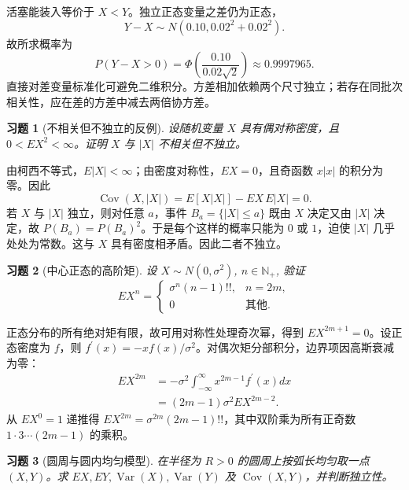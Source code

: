 \documentclass[UTF8,12pt,a4paper,fontset=fandol]{ctexart}
\newtheorem{exercise}{习题}[section]
\begin{document}
\begin{solve}\label{a:A5.30}活塞能装入等价于 $X<Y$。独立正态变量之差仍为正态，\[Y-X\sim N(0.10,0.02^2+0.02^2).\]故所求概率为\[P(Y-X>0)=\Phi\left(\frac{0.10}{0.02\sqrt2}\right)\approx0.9997965.\]直接对差变量标准化可避免二维积分。方差相加依赖两个尺寸独立；若存在同批次相关性，应在差的方差中减去两倍协方差。\end{solve}

\begin{exercise}[不相关但不独立的反例]\label{q:A5.32}
设随机变量 $X$ 具有偶对称密度，且 $0<EX^2<\infty$。证明 $X$ 与 $|X|$ 不相关但不独立。\par{}
\end{exercise}

\begin{solve}\label{a:A5.32}由柯西不等式，$E|X|<\infty$；由密度对称性，$EX=0$，且奇函数 $x|x|$ 的积分为零。因此\[\operatorname{Cov}(X,|X|)=E[X|X|]-EX\,E|X|=0.\]若 $X$ 与 $|X|$ 独立，则对任意 $a$，事件 $B_a=\{|X|\le a\}$ 既由 $X$ 决定又由 $|X|$ 决定，故 $P(B_a)=P(B_a)^2$。于是每个这样的概率只能为 $0$ 或 $1$，迫使 $|X|$ 几乎处处为常数。这与 $X$ 具有密度相矛盾。因此二者不独立。\end{solve}

\begin{exercise}[中心正态的高阶矩]\label{q:A5.33}
设 $X\sim N(0,\sigma^2)$, $n\in\mathbb{N}_+$, 验证
    \[EX^n=\begin{cases}
        \sigma^n(n-1)!!, & n=2m, \\
        0 & \text{其他}.
    \end{cases}\]\par{}
\end{exercise}

\begin{solve}\label{a:A5.33}正态分布的所有绝对矩有限，故可用对称性处理奇次幂，得到 $EX^{2m+1}=0$。设正态密度为 $f$，则 $f^{\prime}(x)=-xf(x)/\sigma^2$。对偶次矩分部积分，边界项因高斯衰减为零：\[\begin{aligned}EX^{2m}&=-\sigma^2\int_{-\infty}^{\infty}x^{2m-1}f^{\prime}(x)dx\\&=(2m-1)\sigma^2EX^{2m-2}.\end{aligned}\]从 $EX^0=1$ 递推得 $EX^{2m}=\sigma^{2m}(2m-1)!!$，其中双阶乘为所有正奇数 $1\cdot3\cdots(2m-1)$ 的乘积。\end{solve}

\begin{exercise}[圆周与圆内均匀模型]\label{q:A5.35}
在半径为 $R>0$ 的圆周上按弧长均匀取一点 $(X,Y)$。求 $EX,EY,\operatorname{Var}(X),\operatorname{Var}(Y)$ 及 $\operatorname{Cov}(X,Y)$，并判断独立性。\par{}
\end{exercise}
\end{document}
